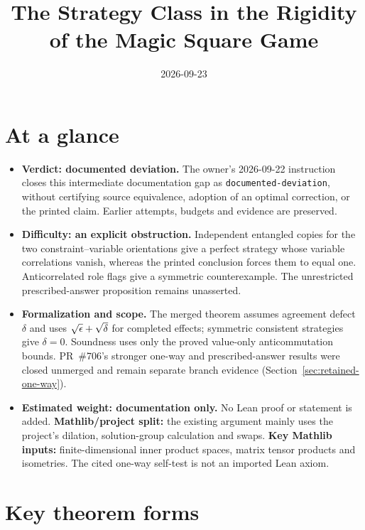 \documentclass[11pt]{article}
\title{The Strategy Class in the Rigidity of the Magic Square Game}
\author{}
\date{2026-09-23}
\begin{document}
\maketitle

\section{At a glance}

\begin{itemize}
  \item \textbf{Verdict: documented deviation.} The owner's 2026-09-22
  instruction closes this intermediate documentation gap as
  \texttt{documented-\allowbreak deviation}, without certifying source equivalence,
  adoption of an optimal correction, or the printed claim. Earlier attempts,
  budgets and evidence are preserved.
  \item \textbf{Difficulty: an explicit obstruction.} Independent entangled
  copies for the two constraint--variable orientations give a perfect
  strategy whose variable correlations vanish, whereas the printed
  conclusion forces them to equal one. Anticorrelated role flags give a
  symmetric counterexample. The unrestricted prescribed-answer proposition
  remains unasserted.
  \item \textbf{Formalization and scope.} The merged theorem assumes
  agreement defect $\delta$ and uses $\sqrt{\epsilon}+\sqrt\delta$ for completed
  effects; symmetric consistent strategies give $\delta=0$. Soundness uses
  only the proved value-only anticommutation bounds. PR~\#706's stronger
  one-way and prescribed-answer results were closed unmerged and remain
  separate branch evidence (Section~\ref{sec:retained-one-way}).
  \item \textbf{Estimated weight: documentation only.} No Lean proof or
  statement is added. \textbf{Mathlib/project split:} the existing argument
  mainly uses the project's dilation, solution-group calculation and swaps.
  \textbf{Key Mathlib inputs:} finite-dimensional inner product spaces,
  matrix tensor products and isometries. The cited one-way self-test
  \cite[Theorem~6.9]{Coladangelo2017Robust} is not an imported Lean axiom.
\end{itemize}

\section{Key theorem forms}
\end{document}
